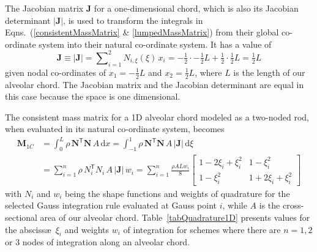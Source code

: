 The Jacobian matrix $\mathbf{J}$ for a one-dimensional chord, which is also its Jacobian determinant $| \mathbf{J} |$, is used to transform the integrals in Eqns.~(\ref{consistentMassMatrix} \& \ref{lumpedMassMatrix}) from their global co-ordinate system into their natural co-ordinate system.  It has a value of
\begin{equation}
     \mathbf{J} \equiv | \mathbf{J} | = \sum\nolimits_{i=1}^2 N_{i,\xi} (\xi) \, x_i = 
     -\tfrac{1}{2} \cdot -\tfrac{1}{2} L + \tfrac{1}{2} \cdot \tfrac{1}{2} L = 
     \tfrac{1}{2} L
     \label{detJac1D}
\end{equation}
given nodal co-ordinates of $x_1 = -\tfrac{1}{2} L$ and $x_2 = \tfrac{1}{2} L$, where $L$ is the length of our alveolar chord.  The Jacobian matrix and the Jacobian determinant are equal in this case because the space is one dimensional. 

The consistent mass matrix for a 1D alveolar chord modeled as a two-noded rod, when evaluated in its natural co-ordinate system, becomes
\begin{equation}
    \begin{aligned}
    \mathbf{M}_{1C} & = \int_0^L \rho \, \mathbf{N}^{\mathsf{T}} \mathbf{N} \, A \, \mathrm{d} x  = \int_{-1}^{1} \rho \, \mathbf{N}^{\mathsf{T}} \mathbf{N}\, A \, | \mathbf{J} | \,  \mathrm{d} \xi \\
    & = \sum_{i=1}^n  \rho  \, N_i^{\mathsf{T}} N_i \, A \, | \mathbf{J} | \, w_i = \sum_{i=1}^n \frac{\rho A L w_i}{8} \begin{bmatrix}
    1 - 2\xi_i + \xi_i^2 & 1 - \xi_i^2 \\
    1 - \xi_i^2 & 1 + 2 \xi_i + \xi_i^2
    \end{bmatrix}
    \end{aligned}
    \label{ConsMassMatrix1DA}
\end{equation}
with $N_i$ and $w_i$ being the shape functions and weights of quadrature for the selected Gauss integration rule evaluated at Gauss point $i$, while $A$ is the cross-sectional area of our alveolar chord. Table~\ref{tabQuadrature1D} presents values for the absciss\ae\ $\xi_i$ and weights $w_i$ of integration for schemes where there are $n = 1, 2$ or $3$ nodes of integration along an alveolar chord.  

